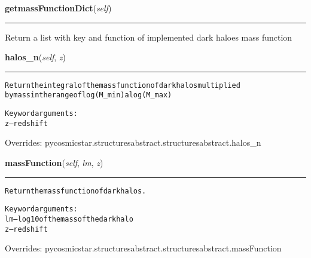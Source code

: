     \label{pycosmicstar:structures:structures:getmassFunctionDict}

    \vspace{0.5ex}

\hspace{.8\funcindent}\begin{boxedminipage}{\funcwidth}

    \raggedright \textbf{getmassFunctionDict}(\textit{self})

    \vspace{-1.5ex}

    \rule{\textwidth}{0.5\fboxrule}
\setlength{\parskip}{2ex}
    Return a list with key and function of implemented dark haloes mass 
    function

\setlength{\parskip}{1ex}
    \end{boxedminipage}

    \vspace{0.5ex}

\hspace{.8\funcindent}\begin{boxedminipage}{\funcwidth}

    \raggedright \textbf{halos\_n}(\textit{self}, \textit{z})

    \vspace{-1.5ex}

    \rule{\textwidth}{0.5\fboxrule}
\setlength{\parskip}{2ex}
\begin{alltt}
Return the integral of the mass function of dark halos multiplied
by mass in the range of log(M\_min) a log(M\_max)

Keyword arguments:
    z -- redshift
\end{alltt}

\setlength{\parskip}{1ex}
      Overrides: pycosmicstar.structuresabstract.structuresabstract.halos\_n

    \end{boxedminipage}

    \vspace{0.5ex}

\hspace{.8\funcindent}\begin{boxedminipage}{\funcwidth}

    \raggedright \textbf{massFunction}(\textit{self}, \textit{lm}, \textit{z})

    \vspace{-1.5ex}

    \rule{\textwidth}{0.5\fboxrule}
\setlength{\parskip}{2ex}
\begin{alltt}
Return the mass function of dark halos.

Keyword arguments:
    lm -- log10 of the mass of the dark halo
    z -- redshift
\end{alltt}

\setlength{\parskip}{1ex}
      Overrides: pycosmicstar.structuresabstract.structuresabstract.massFunction

    \end{boxedminipage}

